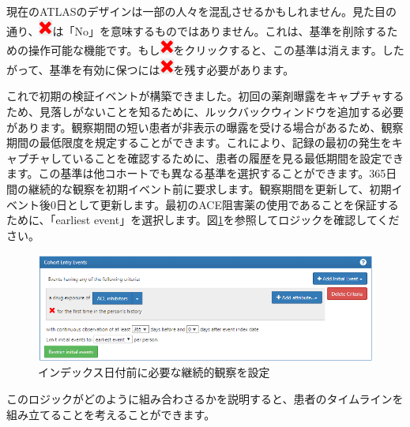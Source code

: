 \documentclass[
  11pt]{book}
\makeatletter
\newenvironment{kframe}{%
\medskip{}
\setlength{\fboxsep}{.8em}
 \def\at@end@of@kframe{}%
 \ifinner\ifhmode%
  \def\at@end@of@kframe{\end{minipage}}%
  \begin{minipage}{\columnwidth}%
 \fi\fi%
 \def\FrameCommand##1{\hskip\@totalleftmargin \hskip-\fboxsep
 \colorbox{myShadeColor}{##1}\hskip-\fboxsep
     \hskip-\linewidth \hskip-\@totalleftmargin \hskip\columnwidth}%
 \MakeFramed {\advance\hsize-\width
   \@totalleftmargin\z@ \linewidth\hsize
   \@setminipage}}%
 {\par\unskip\endMakeFramed%
 \at@end@of@kframe}
\newenvironment{rmdblock}[1]
  {
  \begin{itemize}
  \renewcommand{\labelitemi}{
    \raisebox{-.7\height}[0pt][0pt]{
      {\setkeys{Gin}{width=3em,keepaspectratio}\texttt{[image: images/\#1]}}
    }
  }
  \setlength{\fboxsep}{1em}
  \begin{kframe}
  \item
  }
  {
  \end{kframe}
  \end{itemize}
  }
\newenvironment{rmdimportant}
  {\begin{rmdblock}{important}}
  {\end{rmdblock}}
\theoremstyle{definition}
\theoremstyle{definition}
\theoremstyle{definition}
\theoremstyle{definition}
\theoremstyle{remark}
\makeatother
\begin{document}
\begin{rmdimportant}
現在のATLASのデザインは一部の人々を混乱させるかもしれません。見た目の通り、\includegraphics{images/Cohorts/redX.png}は「No」を意味するものではありません。これは、基準を削除するための操作可能な機能です。もし\includegraphics{images/Cohorts/redX.png}をクリックすると、この基準は消えます。したがって、基準を有効に保つには\includegraphics{images/Cohorts/redX.png}を残す必要があります。
\end{rmdimportant}

これで初期の検証イベントが構築できました。初回の薬剤曝露をキャプチャするため、見落しがないことを知るために、ルックバックウィンドウを追加する必要があります。観察期間の短い患者が非表示の曝露を受ける場合があるため、観察期間の最低限度を規定することができます。これにより、記録の最初の発生をキャプチャしていることを確認するために、患者の履歴を見る最低期間を設定できます。この基準は他コホートでも異なる基準を選択することができます。365日間の継続的な観察を初期イベント前に要求します。観察期間を更新して、初期イベント後0日として更新します。最初のACE阻害薬の使用であることを保証するために、「earliest event」を選択します。図\ref{fig:initialEventAce}を参照してロジックを確認してください。

\begin{figure}

{\centering \includegraphics[width=1\linewidth]{images/Cohorts/initialEventAce} 

}

\caption{インデックス日付前に必要な継続的観察を設定}\label{fig:initialEventAce}
\end{figure}

このロジックがどのように組み合わさるかを説明すると、患者のタイムラインを組み立てることを考えることができます。
\end{document}
